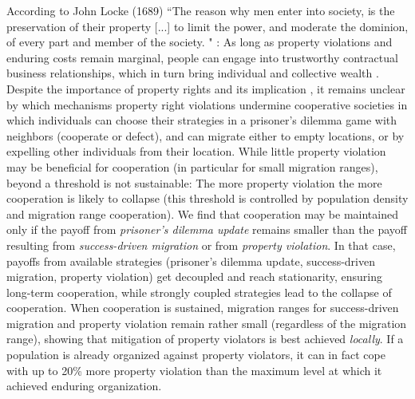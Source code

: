 According to John Locke (1689) ``The reason why men enter into society, is the preservation of their property [...] to limit the power, and moderate the dominion, of every part and member of the society.
" \cite{locke2014second}: As long as property violations and enduring costs remain marginal, people can 
engage into trustworthy contractual business relationships, which in turn bring individual and collective wealth \cite{}. Despite the importance of property rights and its implication \cite{}, it remains unclear by which mechanisms property right violations undermine cooperative societies in which individuals can choose their strategies in a prisoner's dilemma game with neighbors (cooperate or defect), and can migrate either to empty locations, or by expelling other individuals from their location. While little property violation may be beneficial for cooperation (in particular for small migration ranges), beyond a threshold is not sustainable: The more property violation the more cooperation is likely to collapse (this threshold is controlled by population density and migration range cooperation). We find that cooperation may be maintained only if the payoff from {\it prisoner's dilemma update} remains smaller than the payoff resulting from {\it success-driven migration} or from {\it property violation}. In that case, payoffs from available strategies (prisoner's dilemma update, success-driven migration, property violation) get decoupled and reach stationarity, ensuring long-term cooperation, while strongly coupled strategies lead to the collapse of cooperation. When cooperation is sustained, migration ranges for success-driven migration and property violation remain rather small (regardless of the migration range), showing that mitigation of property violators is best achieved {\it locally}. If a population is already organized against property violators, it can in fact cope with up to 20\% more property violation than the maximum level at which it achieved enduring organization.